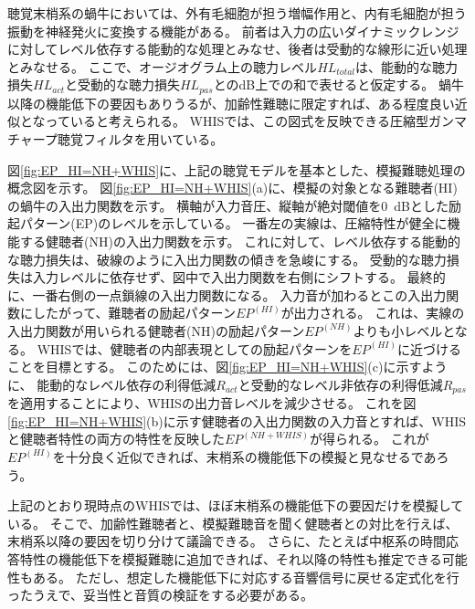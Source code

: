 聴覚末梢系の蝸牛においては、外有毛細胞が担う増幅作用と、内有毛細胞が担う振動を神経発火に変換する機能がある。
前者は入力の広いダイナミックレンジに対してレベル依存する能動的な処理とみなせ、後者は受動的な線形に近い処理とみなせる。
ここで、オージオグラム上の聴力レベル$HL_{total}$は、能動的な聴力損失$HL_{act}$と受動的な聴力損失$HL_{pas}$とのdB上での和で表せると仮定する\cite{moore1997model}。
蝸牛以降の機能低下の要因もありうるが、加齢性難聴に限定すれば、ある程度良い近似となっていると考えられる。
WHISでは、この図式を反映できる圧縮型ガンマチャープ聴覚フィルタ\cite{irino2001compressive,irino2006dynamic}を用いている。


図\ref{fig:EP_HI=NH+WHIS}に、上記の聴覚モデルを基本とした、模擬難聴処理の概念図を示す。
図\ref{fig:EP_HI=NH+WHIS}(a)に、模擬の対象となる難聴者(HI)の蝸牛の入出力関数を示す。
横軸が入力音圧、縦軸が絶対閾値を0~dBとした励起パターン(EP)のレベルを示している。
一番左の実線は、圧縮特性が健全に機能する健聴者(NH)の入出力関数を示す。
これに対して、レベル依存する能動的な聴力損失は、破線のように入出力関数の傾きを急峻にする。
受動的な聴力損失は入力レベルに依存せず、図中で入出力関数を右側にシフトする。
最終的に、一番右側の一点鎖線の入出力関数になる。
入力音が加わるとこの入出力関数にしたがって、難聴者の励起パターン$EP^{(HI)}$が出力される。
これは、実線の入出力関数が用いられる健聴者(NH)の励起パターン$EP^{(NH)}$よりも小レベルとなる。
WHISでは、健聴者の内部表現としての励起パターンを$EP^{(HI)}$に近づけることを目標とする。
このためには、図\ref{fig:EP_HI=NH+WHIS}(c)に示すように、
能動的なレベル依存の利得低減$R_{act}$と受動的なレベル非依存の利得低減$R_{pas}$を適用することにより、WHISの出力音レベルを減少させる。
これを図\ref{fig:EP_HI=NH+WHIS}(b)に示す健聴者の入出力関数の入力音とすれば、WHISと健聴者特性の両方の特性を反映した$EP^{(NH+WHIS)}$が得られる。
これが$EP^{(HI)}$を十分良く近似できれば、末梢系の機能低下の模擬と見なせるであろう。

上記のとおり現時点のWHISでは、ほぼ末梢系の機能低下の要因だけを模擬している。
そこで、加齢性難聴者と、模擬難聴音を聞く健聴者との対比を行えば、末梢系以降の要因を切り分けて議論できる。
さらに、たとえば中枢系の時間応答特性の機能低下を模擬難聴に追加できれば、それ以降の特性も推定できる可能性もある。
ただし、想定した機能低下に対応する音響信号に戻せる定式化を行ったうえで、妥当性と音質の検証をする必要がある。


